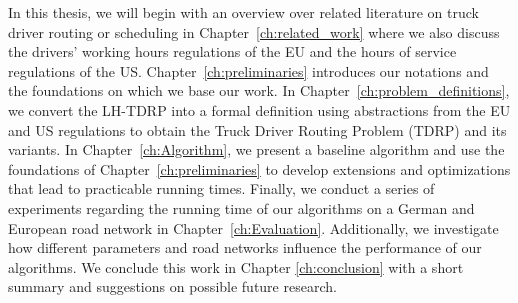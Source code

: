 In this thesis, we will begin with an overview over related literature on truck driver routing or scheduling in Chapter~\ref{ch:related_work} where we also discuss the drivers' working hours regulations of the EU and the hours of service regulations of the US. Chapter~\ref{ch:preliminaries} introduces our notations and the foundations on which we base our work. In Chapter~\ref{ch:problem_definitions}, we convert the LH-TDRP into a formal definition using abstractions from the EU and US regulations to obtain the Truck Driver Routing Problem (TDRP) and its variants. In Chapter~\ref{ch:Algorithm}, we present a baseline algorithm and use the foundations of Chapter~\ref{ch:preliminaries} to develop extensions and optimizations that lead to practicable running times. Finally, we conduct a series of experiments regarding the running time of our algorithms on a German and European road network in Chapter~\ref{ch:Evaluation}. Additionally, we investigate how different parameters and road networks influence the performance of our algorithms. We conclude this work in Chapter \ref{ch:conclusion} with a short summary and suggestions on possible future research.